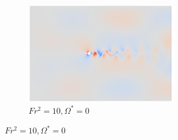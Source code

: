 \begin{figure}
\begin{subfigure}[b]{0.32\textwidth}
        \includegraphics[width=\textwidth]{images/circle/av0fr3.png}
        \caption{$Fr^2 = 10, \Omega^{\ast} = 0$}
        \label{fig:av0frs10}
    \end{subfigure}
    

\end{figure}
